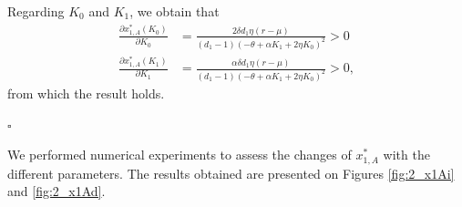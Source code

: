 Regarding $K_0$ and $K_1$, we obtain that
\begin{align*}
\frac{\partial x_{1,A}^* ( K_0) }{\partial K_0}&=\frac{2 \delta d_1 \eta  (r-\mu )}{(d_1-1) (-\theta +\alpha  K_1+2 \eta  K_0)^2}>0\\
\frac{\partial x_{1,A}^* ( K_1) }{\partial K_1}&=\frac{\alpha \delta d_1 \eta  (r-\mu )}{(d_1-1) (-\theta +\alpha  K_1+2 \eta  K_0)^2}>0,
\end{align*}
from which the result holds.
\begin{flushright}
	$\square$
\end{flushright}


We performed numerical experiments to assess the changes of $x^*_{1,A}$ with the different parameters. The results obtained are presented on Figures \ref{fig:2_x1Ai} and \ref{fig:2_x1Ad}.


